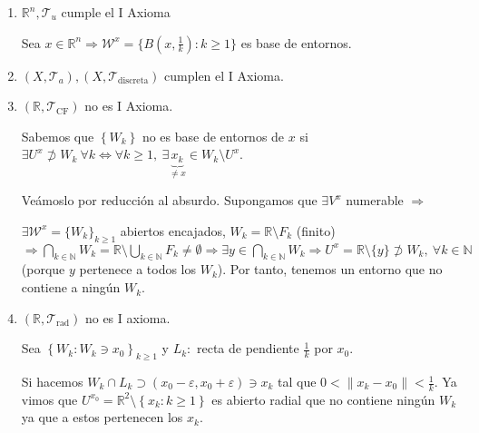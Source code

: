 \begin{ej}
\begin{enumerate}
    \item $\mathbb{R}^n, \mathcal{T}_u$ cumple el I Axioma
    \begin{demo}    
        Sea $x \in \mathbb{R}^n \Rightarrow \mathcal{W}^x = \{B\left( x, \frac{1}{k} \right): k \ge 1\}$ es base de entornos.
    \end{demo}
    \item $\left( X, \mathcal{T}_a \right), \left( X, \mathcal{T}_{\text{discreta}} \right)$ cumplen el I Axioma.
    \item $\left( \mathbb{R}, \mathcal{T}_{\text{CF}} \right)$ no es I Axioma.
    \begin{demo}
    Sabemos que $\left\{ W_k \right\}$ no es base de entornos de $x$ si $\exists U^x \not \supset W_k\ \forall k \Leftrightarrow \forall k \ge 1,\ \exists \underbrace{x_k}_{\neq x} \in W_k \setminus U^x$.

    Veámoslo por reducción al absurdo. Supongamos que $\exists V^x$ numerable $\Rightarrow$

    $\exists \mathcal{W}^x = \{W_k\}_{k \ge 1}$ abiertos encajados, $W_k = \mathbb{R} \setminus F_k$ (finito) $\Rightarrow \bigcap_{k \in \mathbb{N}} W_k = \mathbb{R} \setminus \bigcup_{k \in \mathbb{N}} F_k \neq \emptyset \Rightarrow \exists y \in \bigcap_{k \in \mathbb{N}} W_k \Rightarrow U^x = \mathbb{R}\setminus \{y\} \not \supset W_k,\ \forall k \in \mathbb{N}$ (porque $y$ pertenece a todos los $W_k$). Por tanto, tenemos un entorno que no contiene a ningún $W_k$.
    \end{demo}

    \item $\left( \mathbb{R}, \mathcal{T}_{\text{rad}} \right)$ no es I axioma.
    \begin{demo}
    Sea $\left\{ W_k : W_k \ni x_0 \right\}_{k \ge 1}$ y $L_k:$ recta de pendiente $\frac{1}{k}$ por $x_0$. %

    Si hacemos $W_k \cap L_k \supset \left( x_0 - \varepsilon, x_0 + \varepsilon \right) \ni x_k$ 
    tal que $0 < \lVert x_k - x_0 \rVert < \frac{1}{k}$. Ya vimos que $U^{x_0} = \mathbb{R}^2 \setminus \left\{ x_k: k \ge 1 \right\}$ es abierto radial que 
    no contiene ningún $W_k$ ya que a estos pertenecen los $x_k$.
    \end{demo}
\end{enumerate}
\end{ej}

